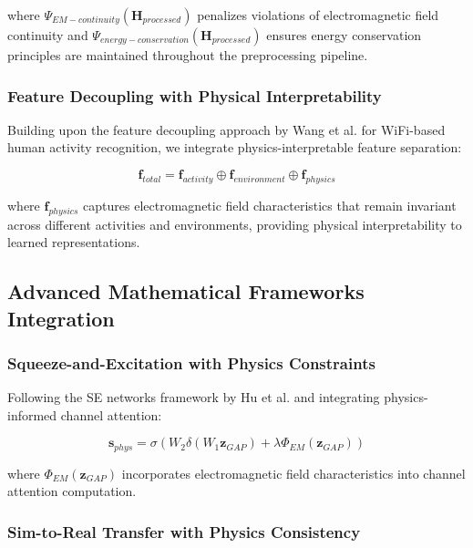 \documentclass[journal]{IEEEtran}
\begin{document}
where $\Psi_{EM-continuity}(\mathbf{H}_{processed})$ penalizes violations of electromagnetic field continuity and $\Psi_{energy-conservation}(\mathbf{H}_{processed})$ ensures energy conservation principles are maintained throughout the preprocessing pipeline.

\subsubsection{Feature Decoupling with Physical Interpretability}

Building upon the feature decoupling approach by Wang et al. \cite{wang2024feature} for WiFi-based human activity recognition, we integrate physics-interpretable feature separation:

\begin{equation}
\mathbf{f}_{total} = \mathbf{f}_{activity} \oplus \mathbf{f}_{environment} \oplus \mathbf{f}_{physics}
\label{eq:feature_physics_decoupling}
\end{equation}

where $\mathbf{f}_{physics}$ captures electromagnetic field characteristics that remain invariant across different activities and environments, providing physical interpretability to learned representations.

\subsection{Advanced Mathematical Frameworks Integration}

\subsubsection{Squeeze-and-Excitation with Physics Constraints}

Following the SE networks framework by Hu et al. \cite{hu2018squeeze} and integrating physics-informed channel attention:

\begin{equation}
\mathbf{s}_{phys} = \sigma(W_2 \delta(W_1 \mathbf{z}_{GAP}) + \lambda \Phi_{EM}(\mathbf{z}_{GAP}))
\label{eq:se_physics}
\end{equation}

where $\Phi_{EM}(\mathbf{z}_{GAP})$ incorporates electromagnetic field characteristics into channel attention computation.

\subsubsection{Sim-to-Real Transfer with Physics Consistency}
\end{document}
